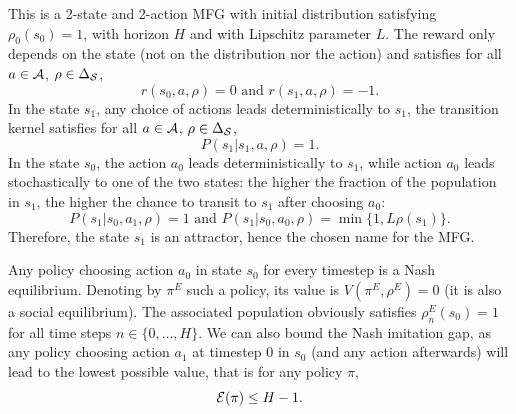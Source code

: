 \documentclass{article}
\begin{document}
This is a 2-state and 2-action MFG with initial distribution  satisfying $\rho_0(s_0)=1$, with horizon $H$ and with Lipschitz parameter $L$. The reward only depends on the state (not on the distribution nor the action) and satisfies for all $a\in\mathcal{A}$, $\rho\in\Delta_{\mathcal{S}}$,
\begin{equation}
    r(s_0,a,\rho) = 0 \text{ and } r(s_1, a, \rho) = -1.
\end{equation}
In the state $s_1$, any choice of actions leads deterministically to $s_1$, the transition kernel satisfies for all $a\in\mathcal{A}$, $\rho\in\Delta_{\mathcal{S}}$,
\begin{equation}
    P(s_1|s_1, a, \rho) = 1. 
\end{equation}
In the state $s_0$, the action $a_0$ leads deterministically  to $s_1$, while action $a_0$ leads stochastically to one of the two states: the higher the fraction of the population in $s_1$, the higher the chance to transit to $s_1$ after choosing $a_0$:
\begin{equation}
    P(s_1|s_0,a_1,\rho) = 1 \text{ and } P(s_1|s_0,a_0,\rho) = \min\{1, L \rho(s_1)\}.
\end{equation}
Therefore, the state $s_1$ is an attractor, hence the chosen name for the MFG.

Any policy choosing action $a_0$ in state $s_0$ for every timestep is a Nash equilibrium. Denoting by $\pi^E$ such a policy, its value is $V(\pi^E, \rho^{E})= 0$ (it is also a social equilibrium). 
The associated population obviously satisfies $\rho^{E}_n(s_0)=1$ for all time steps $n\in\{0,\dots,H\}$. 
We can also bound the Nash imitation gap, as any policy choosing action $a_1$ at timestep $0$ in $s_0$ (and any action afterwards) will lead to the lowest possible value, that is for any policy $\pi$,
\begin{equation}
    \mathcal{E}(\pi) \leq H-1.
\end{equation}
\end{document}
